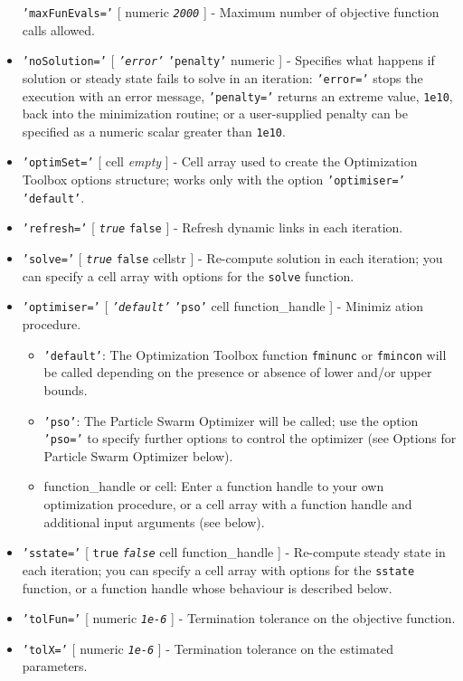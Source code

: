 \begin{itemize}
  \texttt{'maxFunEvals='} {[} numeric \textbar{} \emph{\texttt{2000}}
  {]} - Maximum number of objective function calls allowed.
\item
  \texttt{'noSolution='} {[} \emph{\texttt{'error'}} \textbar{}
  \texttt{'penalty'} \textbar{} numeric {]} - Specifies what happens if
  solution or steady state fails to solve in an iteration:
  \texttt{'error='} stops the execution with an error message,
  \texttt{'penalty='} returns an extreme value, \texttt{1e10}, back into
  the minimization routine; or a user-supplied penalty can be specified
  as a numeric scalar greater than \texttt{1e10}.
\item
  \texttt{'optimSet='} {[} cell \textbar{} \emph{empty} {]} - Cell array
  used to create the Optimization Toolbox options structure; works only
  with the option \texttt{'optimiser='} \texttt{'default'}.
\item
  \texttt{'refresh='} {[} \emph{\texttt{true}} \textbar{} \texttt{false}
  {]} - Refresh dynamic links in each iteration.
\item
  \texttt{'solve='} {[} \emph{\texttt{true}} \textbar{} \texttt{false}
  \textbar{} cellstr {]} - Re-compute solution in each iteration; you
  can specify a cell array with options for the \texttt{solve} function.
\item
  \texttt{'optimiser='} {[} \emph{\texttt{'default'}} \textbar{}
  \texttt{'pso'} \textbar{} cell \textbar{} function\_handle {]} -
  Minimiz ation procedure.

  \begin{itemize}
  \item
    \texttt{'default'}: The Optimization Toolbox function
    \texttt{fminunc} or \texttt{fmincon} will be called depending on the
    presence or absence of lower and/or upper bounds.
  \item
    \texttt{'pso'}: The Particle Swarm Optimizer will be called; use the
    option \texttt{'pso='} to specify further options to control the
    optimizer (see Options for Particle Swarm Optimizer below).
  \item
    function\_handle or cell: Enter a function handle to your own
    optimization procedure, or a cell array with a function handle and
    additional input arguments (see below).
  \end{itemize}
\item
  \texttt{'sstate='} {[} \texttt{true} \textbar{} \emph{\texttt{false}}
  \textbar{} cell \textbar{} function\_handle {]} - Re-compute steady
  state in each iteration; you can specify a cell array with options for
  the \texttt{sstate} function, or a function handle whose behaviour is
  described below.
\item
  \texttt{'tolFun='} {[} numeric \textbar{} \emph{\texttt{1e-6}} {]} -
  Termination tolerance on the objective function.
\item
  \texttt{'tolX='} {[} numeric \textbar{} \emph{\texttt{1e-6}} {]} -
  Termination tolerance on the estimated parameters.
\end{itemize}

